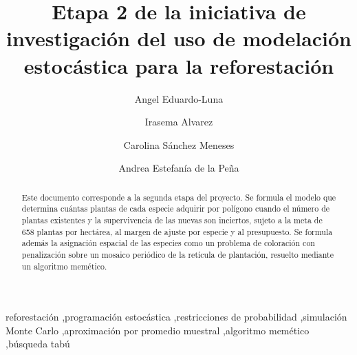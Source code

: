 \documentclass[5p,nonatbib]{elsarticle}
\theoremstyle{definition}
\begin{document}

\begin{frontmatter}

	\title{Etapa 2 de la iniciativa de investigación del uso de modelación estocástica para la reforestación}

	\author[tec]{Angel Eduardo-Luna}
	\author[tec]{Irasema Alvarez}
	\author[tec]{Carolina Sánchez Meneses}
	\author[tec]{Andrea Estefanía de la Peña}
	\address[tec]{Instituto Tecnológico y de Estudios Superiores de Monterrey, MA2004B--- Grupo 202, equipo 5}

	\begin{abstract}
		Este documento corresponde a la segunda etapa del proyecto. Se formula el
		modelo que determina cuántas plantas de cada especie adquirir por polígono
		cuando el número de plantas existentes y la supervivencia de las nuevas son
		inciertos, sujeto a la meta de 658 plantas por hectárea, al margen de ajuste
		por especie y al presupuesto. Se formula además la asignación espacial de
		las especies como un problema de coloración con penalización sobre un mosaico
		periódico de la retícula de plantación, resuelto mediante un algoritmo memético.
	\end{abstract}

	\begin{keyword}
		reforestación \sep programación estocástica \sep restricciones de
		probabilidad \sep simulación Monte Carlo \sep aproximación por promedio muestral \sep algoritmo memético \sep búsqueda tabú
	\end{keyword}
\end{frontmatter}






\nocite{*}
\printbibliography

\appendix
\end{document}
